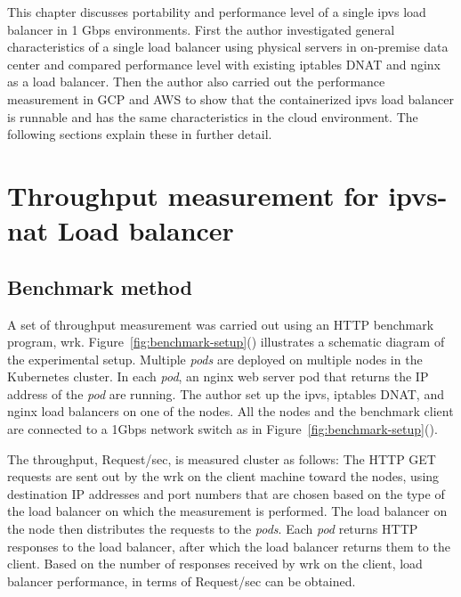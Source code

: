 This chapter discusses portability and performance level of a single ipvs load balancer in 1 Gbps environments.
First the author investigated general characteristics of a single load balancer using physical servers in on-premise data center and compared performance level with existing iptables DNAT and nginx as a load balancer.
Then the author also carried out the performance measurement in GCP and AWS to show that the containerized ipvs load balancer is runnable and has the same characteristics in the cloud environment.
The following sections explain these in further detail.

\section{Throughput measurement for ipvs-nat Load balancer}
\subsection{Benchmark method}

A set of throughput measurement was carried out using an HTTP benchmark program, wrk\cite{Glozer2016}.
Figure~\ref{fig:benchmark-setup}() illustrates a schematic diagram of the experimental setup.
Multiple {\em pods} are deployed on multiple nodes in the Kubernetes cluster. 
In each {\em pod}, an nginx web server pod that returns the IP address of the {\em pod} are running.
The author set up the ipvs, iptables DNAT, and nginx load balancers on one of the nodes.
All the nodes and the benchmark client are connected to a 1Gbps network switch as in Figure~\ref{fig:benchmark-setup}().

The throughput, Request/sec, is measured cluster as follows:
The HTTP GET requests are sent out by the wrk on the client machine toward the nodes,
using destination IP addresses and port numbers that are chosen based on the type of the load balancer on which the measurement is performed.
The load balancer on the node then distributes the requests to the {\em pods}.
Each {\em pod} returns HTTP responses to the load balancer, after which the load balancer returns them to the client.
Based on the number of responses received by wrk on the client, 
load balancer performance, in terms of Request/sec can be obtained. 

